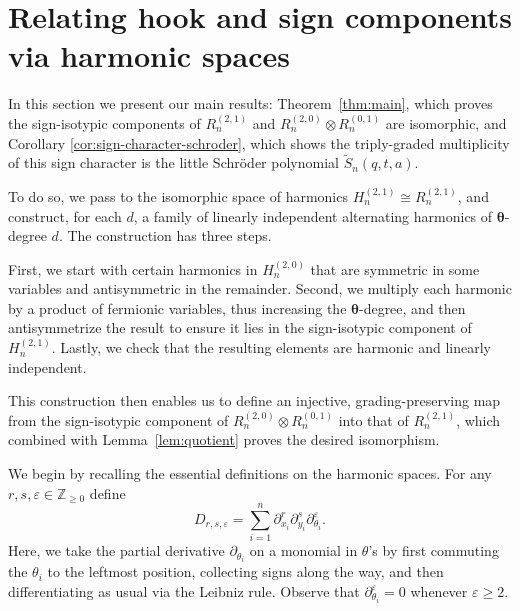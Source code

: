 \documentclass[11pt, noadjust, reqno]{amsart}
\theoremstyle{definition}
\theoremstyle{remark}
\numberwithin{equation}{section}
\newcommand{\0}{\emptyset}
\newcommand{\Z}{\mathbb{Z}}
\begin{document}
\section{Relating hook and sign components via harmonic spaces}\label{sec:main}

In this section we present our main results: Theorem~\ref{thm:main}, which proves the sign-isotypic components of $R_n^{(2,1)}$ and $R_n^{(2,0)} \otimes R_n^{(0,1)}$ are isomorphic, and Corollary \ref{cor:sign-character-schroder}, which shows the triply-graded multiplicity of this sign character is the little Schr\"oder polynomial $\widetilde{S}_n(q,t,a)$.

To do so, we pass to the isomorphic space of harmonics $H_n^{(2,1)} \cong R_n^{(2,1)}$, and construct, for each $d$, a family of linearly independent alternating harmonics of $\bm{\theta}$-degree $d$. The construction has three steps.

First, we start with certain harmonics in $H_n^{(2,0)}$ that are symmetric in some variables and antisymmetric in the remainder. Second, we multiply each harmonic by a product of fermionic variables, thus increasing the $\bm{\theta}$-degree,
and then antisymmetrize the result to ensure it lies in the sign-isotypic component of $H_n^{(2,1)}$.
Lastly, we check that the resulting elements are harmonic and linearly independent. 

This construction then enables us to define an injective, grading-preserving map from the sign-isotypic component of $R_n^{(2,0)} \otimes R_n^{(0,1)}$ into that of $R_n^{(2,1)}$, which combined with Lemma~\ref{lem:quotient} proves the desired isomorphism.
\medskip

We begin by recalling the essential definitions on the harmonic spaces.
For any $r,s,\varepsilon \in \Z_{\geq 0}$ define
\begin{equation*}
    D_{r,s,\varepsilon} = \sum_{i=1}^n \partial_{x_i}^r \partial_{y_i}^s \partial_{\theta_i}^\varepsilon.
\end{equation*}
Here, we take the partial derivative $\partial_{\theta_i}$ on a monomial in $\theta$'s by first commuting the $\theta_i$ to the leftmost position, collecting signs along the way, and then differentiating as usual via the Leibniz rule.
Observe that $\partial_{\theta_i}^\varepsilon = 0$ whenever $\varepsilon \geq 2$.
\end{document}
